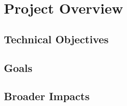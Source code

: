 \section{Project Overview}

\subsection{Technical Objectives}

\blindtext

\subsection{Goals}

\blindtext



\subsection{Broader Impacts}


